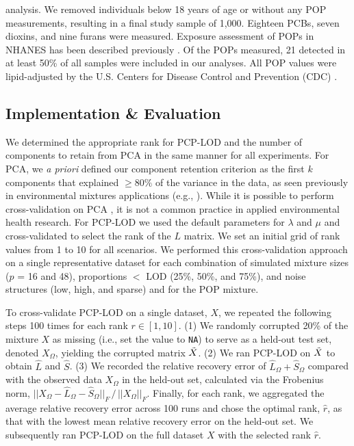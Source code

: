 %
\noindent analysis. We removed individuals below 18 years of age or without any POP measurements, resulting in a final study sample of 1,000. Eighteen PCBs, seven dioxins, and nine furans were measured. Exposure assessment of POPs in NHANES has been described previously \citep{cdc2002a, cdc2002b}. Of the POPs measured, 21 detected in at least 50\% of all samples were included in our analyses. All POP values were lipid-adjusted by the U.S. Centers for Disease Control and Prevention (CDC) \citep{akins1989estimation}. 

\subsection{Implementation \& Evaluation}
\label{methods:eval}
We determined the appropriate rank for PCP-LOD and the number of components to retain from PCA in the same manner for all experiments. For PCA, we \textit{a priori} defined our component retention criterion as the first $k$ components that explained $\geq 80\%$ of the variance in the data, as seen previously in environmental mixtures applications (e.g., \citet{gibson2019overview}). While it is possible to perform cross-validation on PCA \citep{diana2002cross, krzanowski1987cross}, it is not a common practice in applied environmental health research. For PCP-LOD we used the default parameters for $\lambda$ and $\mu$ and cross-validated to select the rank of the $L$ matrix. We set an initial grid of rank values from 1 to 10 for all scenarios. We performed this cross-validation approach on a single representative dataset for each combination of simulated mixture sizes ($p$ = 16 and 48), proportions $<$ LOD (25\%, 50\%, and 75\%), and noise structures (low, high, and sparse) and for the POP mixture.

To cross-validate PCP-LOD on a single dataset, $X$, we repeated the following steps 100 times for each rank $r \in [1,10]$. (1) We randomly corrupted 20\% of the mixture $X$ as missing (i.e., set the value to \texttt{NA}) to serve as a held-out test set, denoted $X_\Omega$, yielding the corrupted matrix $\Tilde{X}$. (2) We ran PCP-LOD on $\Tilde{X}$ to obtain $\hat{L}$ and $\hat{S}$. (3) We recorded the relative recovery error of $\hat{L}_\Omega + \hat{S}_\Omega$ compared with the observed data $X_\Omega$ in the held-out set, calculated via the Frobenius norm, $||X_\Omega - \hat{L}_\Omega - \hat{S}_\Omega ||_F\,/\,||X_\Omega||_F$. Finally, for each rank, we aggregated the average relative recovery error across 100 runs and chose the optimal rank, $\hat{r}$, as that with the lowest mean relative recovery error on the held-out set. We subsequently ran PCP-LOD on the full dataset $X$ with the selected rank $\hat{r}$.

